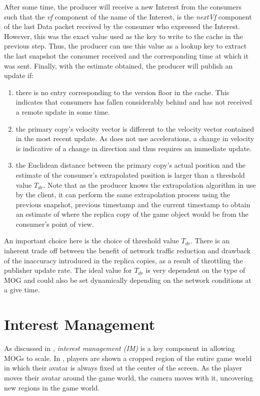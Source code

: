 After some time, the producer will receive a new Interest from the consumers such that the \textit{vf} component of the name of the Interest, is the \textit{nextVf} component of the last Data packet received by the consumer who expressed the Interest. However, this was the exact value used as the key to write to the cache in the previous step. Thus, the producer can use this value as a lookup key to extract the last snapshot the consumer received and the corresponding time at which it was sent. Finally, with the estimate obtained, the producer will publish an update if:


\begin{enumerate}
    \item there is no entry corresponding to the version floor in the cache. This indicates that consumers has fallen considerably behind and has not received a remote update in some time. 
    \item the primary copy's velocity vector is different to the velocity vector contained in the most recent update. As \game{} does not use accelerations, a change in velocity is indicative of a change in direction and thus requires an immediate update.
    \item the Euclidean distance between the primary copy's actual position and the estimate of the consumer's extrapolated position is larger than a threshold value $T_{dr}$. Note that as the producer knows the extrapolation algorithm in use by the client, it can perform the same extrapolation process using the previous snapshot, previous timestamp and the current timestamp to obtain an estimate of where the replica copy of the game object would be from the consumer's point of view. 
\end{enumerate}

An important choice here is the choice of threshold value $T_{dr}$. There is an inherent trade off between the benefit of network traffic reduction and drawback of the inaccuracy introduced in the replica copies, as a result of throttling the publisher update rate. The ideal value for $T_{dr}$ is very dependent on the type of MOG and could also be set dynamically depending on the network conditions at a give time.


\section{Interest Management}\label{sec:des:im}
As discussed in , \textit{interest management (IM)} is a key component in allowing MOGs to scale. In \game{}, players are shown a cropped region of the entire game world in which their avatar is always fixed at the center of the screen. As the player moves their avatar around the game world, the camera moves with it, uncovering new regions in the game world.

